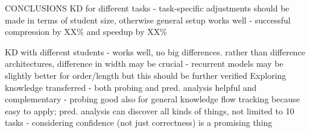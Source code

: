 \documentclass[bsc,frontabs,singlespacing,parskip,deptreport]{infthesis}
\begin{document}
{  CONCLUSIONS
  KD for different tasks
  - task-specific adjustments should be made in terms of student size, otherwise general setup works well
  - successful compression by XX\% and speedup by XX\%

  KD with different students
  - works well, no big differences. rather than difference architectures, difference in width may be crucial
  - recurrent models may be slightly better for order/length but this should be further verified
  Exploring knowledge transferred
  - both probing and pred. analysis helpful and complementary
  - probing good also for general knowledge flow tracking because easy to apply; pred. analysis can discover all kinds of things, not limited to 10 tasks
  - considering confidence (not just correctness) is a promising thing
}
\end{document}
